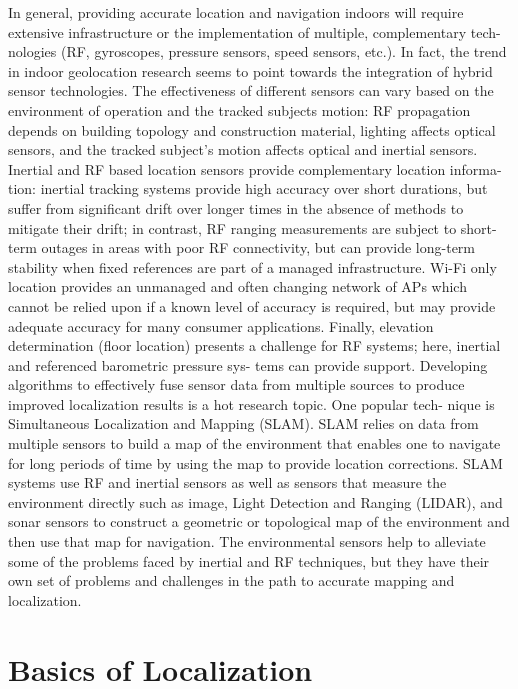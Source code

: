 In general, providing accurate location and navigation indoors will require
extensive infrastructure or the implementation of multiple, complementary tech-
nologies (RF, gyroscopes, pressure sensors, speed sensors, etc.). In fact, the trend
in indoor geolocation research seems to point towards the integration of hybrid
sensor technologies. The effectiveness of different sensors can vary based on the
environment of operation and the tracked subjects motion: RF propagation
depends on building topology and construction material, lighting affects optical
sensors, and the tracked subject’s motion affects optical and inertial sensors.
Inertial and RF based location sensors provide complementary location informa-
tion: inertial tracking systems provide high accuracy over short durations, but
suffer from significant drift over longer times in the absence of methods to mitigate
their drift; in contrast, RF ranging measurements are subject to short-term outages
in areas with poor RF connectivity, but can provide long-term stability when fixed
references are part of a managed infrastructure. Wi-Fi only location provides an
unmanaged and often changing network of APs which cannot be relied upon if a
known level of accuracy is required, but may provide adequate accuracy for many
consumer applications. Finally, elevation determination (floor location) presents a
challenge for RF systems; here, inertial and referenced barometric pressure sys-
tems can provide support.
Developing algorithms to effectively fuse sensor data from multiple sources to
produce improved localization results is a hot research topic. One popular tech-
nique is Simultaneous Localization and Mapping (SLAM). SLAM relies on data
from multiple sensors to build a map of the environment that enables one to
navigate for long periods of time by using the map to provide location corrections.
SLAM systems use RF and inertial sensors as well as sensors that measure the
environment directly such as image, Light Detection and Ranging (LIDAR), and
sonar sensors to construct a geometric or topological map of the environment and
then use that map for navigation. The environmental sensors help to alleviate some
of the problems faced by inertial and RF techniques, but they have their own set of
problems and challenges in the path to accurate mapping and localization.




\section{Basics of Localization}

